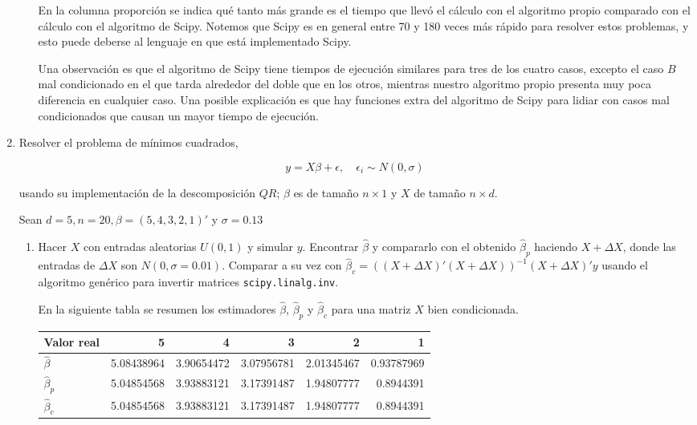 \documentclass{article}
\begin{document}
\begin{enumerate}
\begin{enumerate}
    En la columna proporción se indica qué tanto más grande es el tiempo que llevó el cálculo
    con el algoritmo propio comparado con el cálculo con el algoritmo de Scipy. Notemos que Scipy
    es en general entre 70 y 180 veces más rápido para resolver estos problemas, y esto puede deberse al
    lenguaje en que está implementado Scipy.

    Una observación es que el algoritmo de Scipy tiene tiempos de ejecución similares para tres de los cuatro
    casos, excepto el caso $B$ mal condicionado en el que tarda alrededor del doble que en los otros, mientras 
    nuestro algoritmo propio presenta muy poca diferencia en cualquier caso. Una posible explicación es que 
    hay funciones extra del algoritmo de Scipy para lidiar con casos mal condicionados que causan un mayor
    tiempo de ejecución.

\end{enumerate}


    \item Resolver el problema de mínimos cuadrados,
    
        \[y = X\beta + \epsilon, \quad \epsilon_i \sim N (0, \sigma) \]

    usando su implementación de la descomposición $QR$; $\beta$ es de tamaño 
    $n \times 1$ y $X$ de tamaño $n \times d$.
    
    Sean $d = 5, n = 20, \beta = (5, 4, 3, 2, 1)'$ y $\sigma = 0.13$

    \begin{enumerate}
        \item Hacer $X$ con entradas aleatorias $U (0, 1)$ y simular $y$. Encontrar $\hat\beta$
         y compararlo con el obtenido $\hat\beta_p$ haciendo $X + \Delta X$, donde las 
         entradas de $\Delta X$ son $N (0, \sigma = 0.01)$. Comparar a su vez con 
         $\hat\beta_c = ((X + \Delta X)'(X + \Delta X))^{-1}(X + \Delta X)'y$ usando el 
         algoritmo genérico para invertir matrices \texttt{scipy.linalg.inv}.

        En la siguiente tabla se resumen los estimadores $\hat\beta$, $\hat\beta_p$ y $\hat\beta_c$
        para una matriz $X$ bien condicionada. 
        \begin{center}
            \begin{tabular}{@{}lrrrrr@{}}
                \toprule
                Valor real & 5 & 4 & 3 & 2 & 1 \\ \midrule
                $\hat\beta$ & 5.08438964 & 3.90654472 & 3.07956781 & 2.01345467 & 0.93787969 \\
                $\hat\beta_p$ & 5.04854568 & 3.93883121 & 3.17391487 & 1.94807777 & 0.8944391 \\
                $\hat\beta_c$ & 5.04854568 & 3.93883121 & 3.17391487 & 1.94807777 & 0.8944391 \\ \bottomrule
                \end{tabular}
        \end{center}


\end{enumerate}
\end{enumerate}
\end{document}
